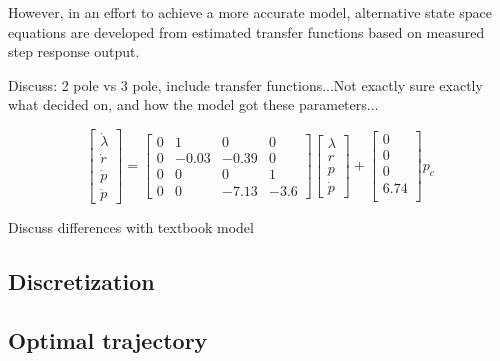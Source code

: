 However, in an effort to achieve a more accurate model, alternative state space equations are developed from estimated transfer functions based on measured step response output.

Discuss: 2 pole vs 3 pole, include transfer functions...Not exactly sure exactly what decided on, and how the model got these parameters...

\begin{equation*}
	\begin{bmatrix}
		\dot{\lambda}\\
		\dot{r}\\
		\dot{p}\\
		\ddot{p}
	\end{bmatrix} = 
	\begin{bmatrix}
		0 & 1 & 0 & 0 \\
		0 & -0.03 & -0.39 & 0 \\
		0 & 0 & 0 & 1 \\
		0 & 0 & -7.13 & -3.6
	\end{bmatrix}
	\begin{bmatrix}
		\lambda	\\
		r		\\
		p		\\
		\dot{p}
	\end{bmatrix} +
	\begin{bmatrix}
		0 \\
		0 \\
		0 \\
		6.74 \\
	\end{bmatrix}
	p_c
\end{equation*}

Discuss differences with textbook model

\subsection{Discretization}

\subsection{Optimal trajectory}

